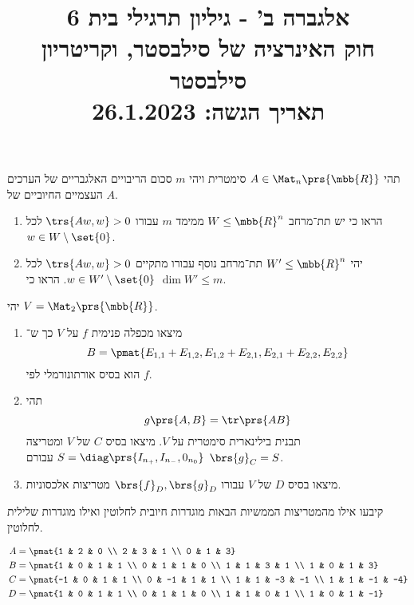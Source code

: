 \documentclass[a4paper,10pt,twoside,openany]{article}
\title{
אלגברה ב' - גיליון תרגילי בית 6 \\
חוק האינרציה של סילבסטר, וקריטריון סילבסטר
\\
\vspace{1cm}
\large{תאריך הגשה: 26.1.2023}
}
\date{}
\begin{document}
\maketitle

\begin{exercise}
תהי
$A \in \Mat_n\prs{\mbb{R}}$
סימטרית ויהי
$m$
סכום הריבויים האלגבריים של הערכים העצמיים החיוביים של
$A$.

\begin{enumerate}
\item הראו כי יש תת־מרחב
$W \leq \mbb{R}^n$
ממימד
$m$
עבורו
$\trs{Aw, w} > 0$
לכל
$w \in W \setminus \set{0}$.

\item יהי
$W' \leq \mbb{R}^n$
תת־מרחב נוסף עבורו מתקיים
$\trs{Aw, w} > 0$
לכל
$w \in W' \setminus \set{0}$.
הראו כי
$\dim W' \leq m$.
\end{enumerate}
\end{exercise}

\begin{exercise}
יהי
$V = \Mat_2\prs{\mbb{R}}$.

\begin{enumerate}
    \item מיצאו מכפלה פנימית
    $f$
    על
    $V$
    כך ש־%
    \[B = \pmat{E_{1,1} + E_{1,2}, E_{1,2} + E_{2,1}, E_{2,1} + E_{2,2}, E_{2,2}}\]
    הוא בסיס אורתונורמלי לפי
    $f$.
    
    \item
    תהי
    \[g\prs{A,B} = \tr\prs{AB}\]
    תבנית בילינארית סימטרית על
    $V$.
    מיצאו בסיס
    $C$
    של
    $V$
    ומטריצה
    $S = \diag\prs{I_{n_+}, I_{n_-}, 0_{n_0}}$
    עבורם
    $\brs{g}_C = S$.
    
    \item
    מיצאו בסיס
    $D$
    של
    $V$
    עבורו
    $\brs{f}_D, \brs{g}_D$
    מטריצות אלכסוניות.
\end{enumerate}
\end{exercise}

\begin{exercise}
קיבעו אילו מהמטריצות הממשיות הבאות מוגדרות חיובית לחלוטין ואילו מוגדרות שלילית לחלוטין.

\begin{align*}
    A &= \pmat{1 & 2 & 0 \\ 2 & 3 & 1 \\ 0 & 1 & 3} \\
    B &= \pmat{1 & 0 & 1 & 1 \\ 0 & 1 & 1 & 0 \\ 1 & 1 & 3 & 1 \\ 1 & 0 & 1 & 3} \\
    C &= \pmat{-1 & 0 & 1 & 1 \\ 0 & -1 & 1 & 1 \\ 1 & 1 & -3 & -1 \\ 1 & 1 & -1 & -4} \\
    D &= \pmat{1 & 0 & 1 & 1 \\ 0 & 1 & 1 & 0 \\ 1 & 1 & 0 & 1 \\ 1 & 0 & 1 & -1}
\end{align*}
\end{exercise}
\end{document}
